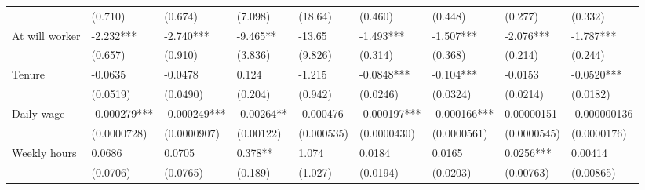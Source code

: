 \begin{tabular}{lrrrrrrrr}
      & \multicolumn{1}{l}{(0.710)} & \multicolumn{1}{l}{(0.674)} & \multicolumn{1}{l}{(7.098)} & \multicolumn{1}{l}{(18.64)} & \multicolumn{1}{l}{(0.460)} & \multicolumn{1}{l}{(0.448)} & \multicolumn{1}{l}{(0.277)} & \multicolumn{1}{l}{(0.332)} \\
At will worker & \multicolumn{1}{l}{-2.232***} & \multicolumn{1}{l}{-2.740***} & \multicolumn{1}{l}{-9.465**} & \multicolumn{1}{l}{-13.65} & \multicolumn{1}{l}{-1.493***} & \multicolumn{1}{l}{-1.507***} & \multicolumn{1}{l}{-2.076***} & \multicolumn{1}{l}{-1.787***} \\
      & \multicolumn{1}{l}{(0.657)} & \multicolumn{1}{l}{(0.910)} & \multicolumn{1}{l}{(3.836)} & \multicolumn{1}{l}{(9.826)} & \multicolumn{1}{l}{(0.314)} & \multicolumn{1}{l}{(0.368)} & \multicolumn{1}{l}{(0.214)} & \multicolumn{1}{l}{(0.244)} \\
Tenure & \multicolumn{1}{l}{-0.0635} & \multicolumn{1}{l}{-0.0478} & \multicolumn{1}{l}{0.124} & \multicolumn{1}{l}{-1.215} & \multicolumn{1}{l}{-0.0848***} & \multicolumn{1}{l}{-0.104***} & \multicolumn{1}{l}{-0.0153} & \multicolumn{1}{l}{-0.0520***} \\
      & \multicolumn{1}{l}{(0.0519)} & \multicolumn{1}{l}{(0.0490)} & \multicolumn{1}{l}{(0.204)} & \multicolumn{1}{l}{(0.942)} & \multicolumn{1}{l}{(0.0246)} & \multicolumn{1}{l}{(0.0324)} & \multicolumn{1}{l}{(0.0214)} & \multicolumn{1}{l}{(0.0182)} \\
Daily wage & \multicolumn{1}{l}{-0.000279***} & \multicolumn{1}{l}{-0.000249***} & \multicolumn{1}{l}{-0.00264**} & \multicolumn{1}{l}{-0.000476} & \multicolumn{1}{l}{-0.000197***} & \multicolumn{1}{l}{-0.000166***} & \multicolumn{1}{l}{0.00000151} & \multicolumn{1}{l}{-0.000000136} \\
      & \multicolumn{1}{l}{(0.0000728)} & \multicolumn{1}{l}{(0.0000907)} & \multicolumn{1}{l}{(0.00122)} & \multicolumn{1}{l}{(0.000535)} & \multicolumn{1}{l}{(0.0000430)} & \multicolumn{1}{l}{(0.0000561)} & \multicolumn{1}{l}{(0.0000545)} & \multicolumn{1}{l}{(0.0000176)} \\
Weekly hours & \multicolumn{1}{l}{0.0686} & \multicolumn{1}{l}{0.0705} & \multicolumn{1}{l}{0.378**} & \multicolumn{1}{l}{1.074} & \multicolumn{1}{l}{0.0184} & \multicolumn{1}{l}{0.0165} & \multicolumn{1}{l}{0.0256***} & \multicolumn{1}{l}{0.00414} \\
      & \multicolumn{1}{l}{(0.0706)} & \multicolumn{1}{l}{(0.0765)} & \multicolumn{1}{l}{(0.189)} & \multicolumn{1}{l}{(1.027)} & \multicolumn{1}{l}{(0.0194)} & \multicolumn{1}{l}{(0.0203)} & \multicolumn{1}{l}{(0.00763)} & \multicolumn{1}{l}{(0.00865)} \\

\end{tabular}
